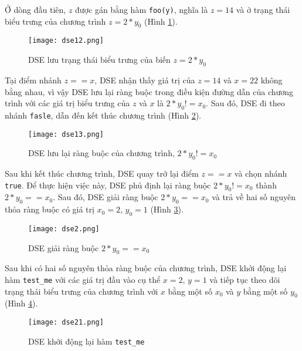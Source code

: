 Ở dòng đầu tiên, $ z $ được gán bằng hàm \texttt{foo(y)}, nghĩa là $ z = 14 $ 
và ở trạng thái biểu trưng của chương trình $ z = 2*y_{0} $ (Hình \ref{fig:dse12}).

\begin{figure}[H]	
	\begin{center}
		\texttt{[image: dse12.png]}
	\end{center}
	\caption{DSE lưu trạng thái biểu trưng của biến $ z = 2*y_{0} $}
	\label{fig:dse12}	
\end{figure}

Tại điểm nhánh $ z == x $, DSE nhận thấy giá trị của $ z = 14$ và $ x = 22 $ 
không bằng nhau, vì vậy DSE lưu lại ràng buộc trong điều kiện đường dẫn của 
chương trình với các giá trị biểu trưng của $ z $ và $ x $ là $ 2*y_{0} != x_{0} $. 
Sau đó, DSE đi theo nhánh \texttt{fasle}, dẫn đến kết thúc chương trình (Hình \ref{fig:dse13}).

\begin{figure}[H]	
	\begin{center}
		\texttt{[image: dse13.png]}
	\end{center}
	\caption{DSE lưu lại ràng buộc của chương trình, $ 2*y_{0} != x_{0} $  }
	\label{fig:dse13}	
\end{figure}

Sau khi kết thúc chương trình, DSE quay trở lại điểm $ z == x $ và chọn nhánh 
\texttt{true}. Để thực hiện việc này, DSE phủ định lại ràng buộc $2*y_{0} != x_{0}$ 
thành $2*y_{0} == x_{0}$. Sau đó, DSE giải ràng buộc $2*y_{0} == x_{0}$ và trả về 
hai số nguyên thỏa ràng buộc có giá trị $ x_{0} = 2$, $ y_{0} = 1 $ (Hình \ref{fig:dse2}).

\begin{figure}[H]	
	\begin{center}
		\texttt{[image: dse2.png]}
	\end{center}
	\caption{DSE giải ràng buộc $2*y_{0} == x_{0}$}
	\label{fig:dse2}	
\end{figure}

Sau khi có hai số nguyên thỏa ràng buộc của chương trình, DSE khởi động lại hàm 
\texttt{test\_me} với các giá trị đầu vào cụ thể $ x = 2 $, $ y = 1 $ và tiếp tục 
theo dõi trạng thái biểu trưng của chương trình với $ x $ bằng một số $x_{0}$ và 
$ y $ bằng một số $y_{0}$ (Hình \ref{fig:dse21}).

\begin{figure}[H]	
	\begin{center}
		\texttt{[image: dse21.png]}
	\end{center}
	\caption{DSE khởi động lại hàm \texttt{test\_me}}
	\label{fig:dse21}		
\end{figure}


